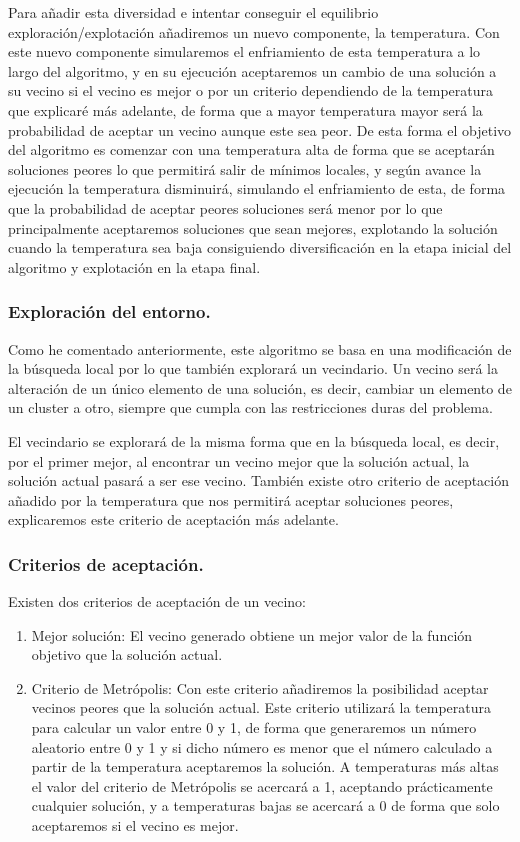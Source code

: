 \documentclass[12pt, spanish]{article}
\begin{document}
Para añadir esta diversidad e intentar conseguir el equilibrio exploración/explotación añadiremos un nuevo componente, la temperatura. Con este nuevo componente simularemos el enfriamiento de esta temperatura a lo largo del algoritmo, y en su ejecución aceptaremos un cambio de una solución a su vecino si el vecino es mejor o por un criterio dependiendo de la temperatura que explicaré más adelante, de forma que a mayor temperatura mayor será la probabilidad de aceptar un vecino aunque este sea peor. De esta forma el objetivo del algoritmo es comenzar con una temperatura alta de forma que se aceptarán soluciones peores lo que permitirá salir de mínimos locales, y según avance la ejecución la temperatura disminuirá, simulando el enfriamiento de esta, de forma que la probabilidad de aceptar peores soluciones será menor por lo que principalmente aceptaremos soluciones que sean mejores, explotando la solución cuando la temperatura sea baja consiguiendo diversificación en la etapa inicial del algoritmo y explotación en la etapa final.


\subsubsection{Exploración del entorno.}

Como he comentado anteriormente, este algoritmo se basa en una modificación de la búsqueda local por lo que también explorará un vecindario. Un vecino será la alteración de un único elemento de una solución, es decir, cambiar un elemento de un cluster a otro, siempre que cumpla con las restricciones duras del problema.

El vecindario se explorará de la misma forma que en la búsqueda local, es decir, por el primer mejor, al encontrar un vecino mejor que la solución actual, la solución actual pasará a ser ese vecino. También existe otro criterio de aceptación añadido por la temperatura que nos permitirá aceptar soluciones peores, explicaremos este criterio de aceptación más adelante.



\subsubsection{Criterios de aceptación.}

Existen dos criterios de aceptación de un vecino:

\begin{enumerate}
	\item Mejor solución: El vecino generado obtiene un mejor valor de la función objetivo que la solución actual.
	\item Criterio de Metrópolis: Con este criterio añadiremos la posibilidad aceptar vecinos peores que la solución actual. Este criterio utilizará la temperatura para calcular un valor entre 0 y 1, de forma que generaremos un número aleatorio entre 0 y 1 y si dicho número es menor que el número calculado a partir de la temperatura aceptaremos la solución. A temperaturas más altas el valor del criterio de Metrópolis se acercará a 1, aceptando prácticamente cualquier solución, y a temperaturas bajas se acercará a 0 de forma que solo aceptaremos si el vecino es mejor.
\end{enumerate}
\end{document}
